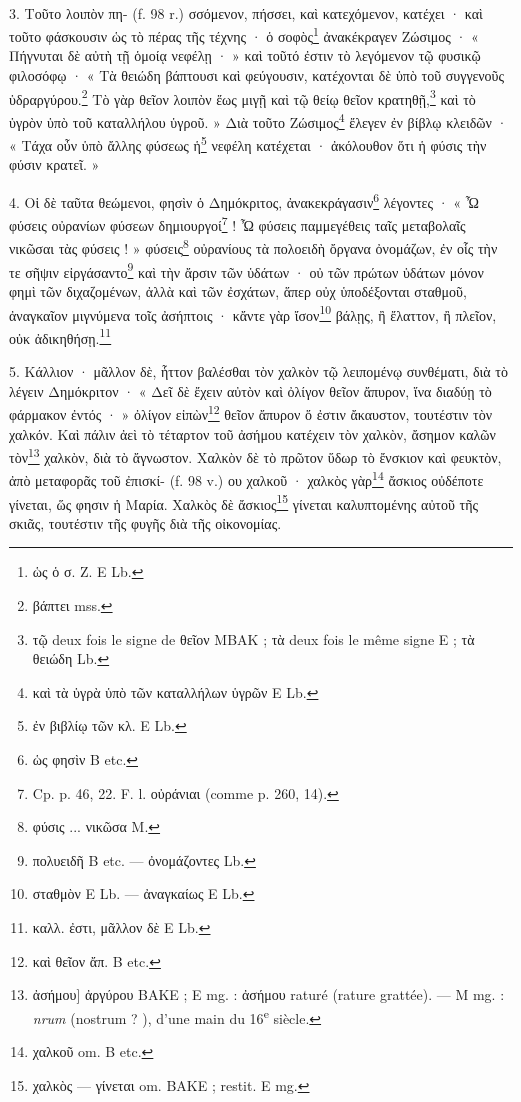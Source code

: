 \documentclass[a4paper, 11pt, oneside, polutonikogreek, french]{article}
\begin{document}
\paragraph{}
3. Τοῦτο λοιπὸν πη- (f. 98 r.) σσόμενον, πήσσει, καὶ κατεχόμενον, κατέχει · καὶ τοῦτο φάσκουσιν ὡς τὸ πέρας τῆς τέχνης · ὁ σοφὸς\footnote{ὡς ὁ σ. Ζ. E Lb.} ἀνακέκραγεν Ζώσιμος · « Πήγνυται δὲ αὐτὴ τῇ ὁμοίᾳ νεφέλῃ · » καὶ τοῦτό ἐστιν τὸ λεγόμενον τῷ φυσικῷ φιλοσόφῳ · « Τὰ θειώδη βάπτουσι καὶ φεύγουσιν, κατέχονται δὲ ὑπὸ τοῦ συγγενοῦς ὑδραργύρου.\footnote{βάπτει mss.} Τὸ γὰρ θεῖον λοιπὸν ἕως μιγῇ καὶ τῷ θείῳ θεῖον κρατηθῇ,\footnote{τῷ deux fois le signe de θεῖον MBAK ; τὰ deux fois le même signe E ; τὰ θειώδη Lb.} καὶ τὸ ὑγρὸν ὑπὸ τοῦ καταλλήλου ὑγροῦ. » Διὰ τοῦτο Ζώσιμος\footnote{καὶ τὰ ὑγρὰ ὑπὸ τῶν καταλλήλων ὑγρῶν E Lb.} ἔλεγεν ἐν βίβλῳ κλειδῶν · « Τάχα οὖν ὑπὸ ἄλλης φύσεως ἡ\footnote{ἐν βιβλίῳ τῶν κλ. E Lb.} νεφέλη κατέχεται · ἀκόλουθον ὅτι ἡ φύσις τὴν φύσιν κρατεῖ. »

4. Οἱ δὲ ταῦτα θεώμενοι, φησὶν ὁ Δημόκριτος, ἀνακεκράγασιν\footnote{ὡς φησὶν B etc.} λέγοντες · « Ὦ φύσεις οὐρανίων φύσεων δημιουργοί\footnote{Cp. p. 46, 22. F. l. οὐράνιαι (comme p. 260, 14).} ! Ὦ φύσεις παμμεγέθεις ταῖς μεταβολαῖς νικῶσαι τὰς φύσεις ! » φύσεις\footnote{φύσις ... νικῶσα M.} οὐρανίους τὰ πολοειδὴ ὄργανα ὀνομάζων, ἐν οἷς τὴν τε σῆψιν εἰργάσαντο\footnote{πολυειδῆ B etc. --- ὀνομάζοντες Lb.} καὶ τὴν ἄρσιν τῶν ὑδάτων · οὐ τῶν πρώτων ὑδάτων μόνον φημὶ τῶν διχαζομένων, ἀλλὰ καὶ τῶν ἐσχάτων, ἅπερ οὐχ ὑποδέξονται σταθμοῦ, ἀναγκαῖον μιγνύμενα τοῖς ἀσήπτοις · κἄντε γὰρ ἴσον\footnote{σταθμὸν E Lb. --- ἀναγκαίως E Lb.} βάλῃς, ἢ ἔλαττον, ἢ πλεῖον, οὐκ ἀδικηθήσῃ.\footnote{καλλ. ἐστι, μᾶλλον δὲ E Lb.}

5. Κάλλιον · μᾶλλον δὲ, ἧττον βαλέσθαι τὸν χαλκὸν τῷ λειπομένῳ συνθέματι, διὰ τὸ λέγειν Δημόκριτον · « Δεῖ δὲ ἔχειν αὐτὸν καὶ ὀλίγον θεῖον ἄπυρον, ἵνα διαδύῃ τὸ φάρμακον ἐντός · » ὀλίγον εἰπὼν\footnote{καὶ θεῖον ἄπ. B etc.} θεῖον ἄπυρον ὅ ἐστιν ἄκαυστον, τουτέστιν τὸν χαλκόν. Καὶ πάλιν ἀεὶ τὸ τέταρτον τοῦ ἀσήμου κατέχειν τὸν χαλκὸν, ἄσημον καλῶν τὸν\footnote{ἀσήμου] ἀργύρου BAKE ; E mg. : ἀσήμου raturé (rature grattée). --- M mg. : \emph{nrum} (nostrum ? ), d'une main du 16\textsuperscript{e} siècle.} χαλκὸν, διὰ τὸ ἄγνωστον. Χαλκὸν δὲ τὸ πρῶτον ὕδωρ τὸ ἔνσκιον καὶ φευκτὸν, ἀπὸ μεταφορᾶς τοῦ ἐπισκί- (f. 98 v.) ου χαλκοῦ · χαλκὸς γὰρ\footnote{χαλκοῦ om. B etc.} ἄσκιος οὐδέποτε γίνεται, ὥς φησιν ἡ Μαρία. Χαλκὸς δὲ ἄσκιος\footnote{χαλκὸς --- γίνεται om. BAKE ; restit. E mg.} γίνεται καλυπτομένης αὐτοῦ τῆς σκιᾶς, τουτέστιν τῆς φυγῆς διὰ τῆς οἰκονομίας.
\end{document}
